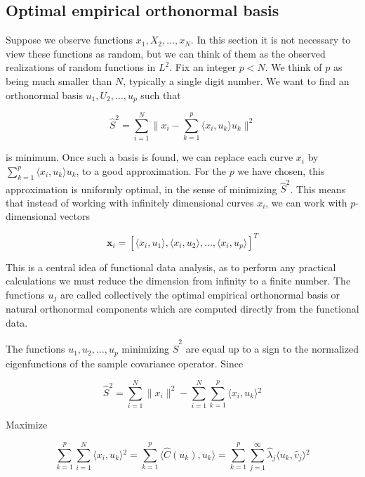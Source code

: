 \subsection{Optimal empirical orthonormal basis}

Suppose we observe functions $x_1, X_2, \ldots, x_N$. In this section it is not necessary to view these functions as random, but we can think of them as the observed realizations of random functions in $L^2$. Fix an integer $p < N$. We think of $p$ as being much smaller than $N$, typically a single digit number. We want to find an orthonormal basis $u_1, U_2, \ldots, u_p$ such that

\begin{equation}
  \hat{S}^2 = \sum_{i = 1}^{N}\| x_i - \sum_{k = 1}^{p} \langle{} x_i, u_k \rangle{} u_k \|^2
\end{equation}

is minimum. Once such a basis is found, we can replace each curve $x_i$ by $\sum_{k=1}^{p}\langle{}x_i, u_k\rangle{}u_k$, to a good approximation. For the $p$ we have chosen, this approximation is uniformly optimal, in the sense of minimizing $\hat{S}^2$. This means that instead of working with infinitely dimensional curves $x_i$, we can work with $p$-dimensional vectors

\begin{equation}
  \textbf{x}_i = [\langle{}x_i, u_1\rangle{}, \langle{}x_i, u_2\rangle{}, \ldots, \langle{}x_i, u_p\rangle{}]^{T}
\end{equation}

This is a central idea of functional data analysis, as to perform any practical calculations we must reduce the dimension from infinity to a finite number. The functions $u_j$ are called collectively the optimal empirical orthonormal basis or natural orthonormal components which are computed directly from the functional data.

The functions $u_1, u_2, \ldots, u_p$ minimizing $\hat{S}^2$ are equal up to a sign to the normalized eigenfunctions of the sample covariance operator. Since

\begin{equation}
  \hat{S}^2 = \sum_{i = 1}^{N}\| x_i \|^2 - \sum_{ i = 1 }^{N}\sum_{ k = 1}^{p}\langle{} x_i, u_k \rangle{}^2
\end{equation}

Maximize

\begin{equation}
  \sum_{k=1}^{p}\sum_{i=1}^{N}\langle{}x_i, u_k\rangle{}^2 = \sum_{k=1}^{p}\langle{}\hat{C}(u_k), u_k\rangle{} = \sum_{k=1}^{p}\sum_{j=1}^{\infty}\hat{\lambda}_j\langle{}u_k, \hat{v}_j\rangle{}^2
\end{equation}


